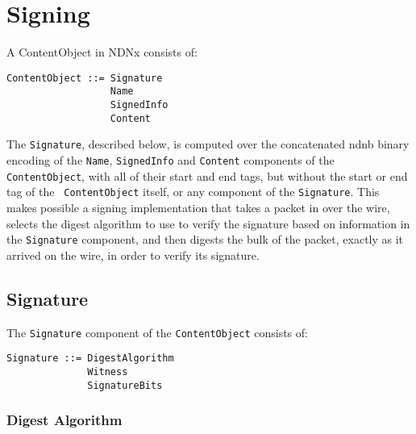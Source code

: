 \section{Signing}
\label{sec:Signing}

A ContentObject in NDNx consists of:

\begin{verbatim}
ContentObject ::= Signature
                  Name
                  SignedInfo
                  Content
\end{verbatim}

The {\tt Signature}, described below, is computed over the
concatenated ndnb binary encoding of the {\tt Name}, {\tt SignedInfo}
and {\tt Content} components of the {\tt ContentObject}, with all of
their start and end tags, but without the start or end tag of the {\tt
  ContentObject} itself, or any component of the {\tt Signature}. This
makes possible a signing implementation that takes a packet in over
the wire, selects the digest algorithm to use to verify the signature
based on information in the {\tt Signature} component, and then
digests the bulk of the packet, exactly as it arrived on the wire, in
order to verify its signature.


\subsection{Signature}

The {\tt Signature} component of the {\tt ContentObject} consists of:

\begin{verbatim}
Signature ::= DigestAlgorithm
              Witness
              SignatureBits
\end{verbatim}


\subsubsection{Digest Algorithm}

